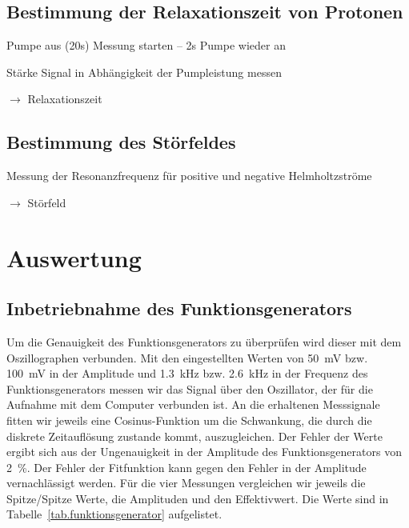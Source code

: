 \documentclass[paper=a4,
	fontsize=10pt,
	DIV=18,
	twocolumn,
	parskip=half
	]{scrartcl}
\numberwithin{equation}{section}    %
\newcommand{\tra}{$\rightarrow $}
\begin{document}
\subsection{Bestimmung der Relaxationszeit von Protonen}
\label{vorbereitung7}

\begin{compactitem}
	\item Pumpe aus (20s) Messung starten \--- 2s Pumpe wieder an
	\item Stärke Signal in Abhängigkeit der Pumpleistung messen
	\item[\tra] Relaxationszeit
\end{compactitem}
\subsection{Bestimmung des Störfeldes}
\label{vorbereitung8}

\begin{compactitem}
	\item Messung der Resonanzfrequenz für positive und negative Helmholtzströme
	\item[\tra] Störfeld
\end{compactitem}


%
\section{Auswertung}
\label{auswertung}
%
\subsection{Inbetriebnahme des Funktionsgenerators}
\label{auswertung1}

Um die Genauigkeit des Funktionsgenerators zu überprüfen wird dieser mit dem Oszillographen verbunden. Mit den eingestellten Werten von \SI{50}{\milli\volt} bzw. \SI{100}{\milli\volt} in der Amplitude und \SI{1.3}{\kilo\hertz} bzw. \SI{2.6}{\kilo\hertz} in der Frequenz des Funktionsgenerators messen wir das Signal über den Oszillator, der für die Aufnahme mit dem Computer verbunden ist. An die erhaltenen Messsignale fitten wir jeweils eine Cosinus-Funktion um die Schwankung, die durch die diskrete Zeitauflösung zustande kommt, auszugleichen. Der Fehler der Werte ergibt sich aus der Ungenauigkeit in der Amplitude des Funktionsgenerators von \SI{2}{\percent}. Der Fehler der Fitfunktion kann gegen den Fehler in der Amplitude vernachlässigt werden. Für die vier Messungen vergleichen wir jeweils die Spitze/Spitze Werte, die Amplituden und den Effektivwert. Die Werte sind in Tabelle~\ref{tab.funktionsgenerator} aufgelistet.
\end{document}
